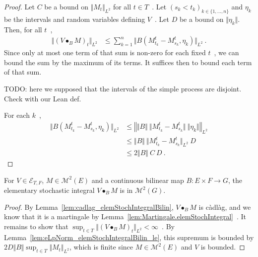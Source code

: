 \begin{proof}
Let $C$ be a bound on $\Vert M_t \Vert_{L^2}$ for all $t \in T$~.
Let $(s_k < t_k)_{k \in \{1, ..., n\}}$ and $\eta_k$ be the intervals and random variables defining $V$~.
Let $D$ be a bound on $\Vert\eta_k\Vert$.
Then, for all $t$~,
\begin{align*}
  \Vert (V \bullet_B M)_t \Vert_{L^2}
  &\le \sum_{k=1}^n \Vert B(M^t_{t_k} - M^t_{s_k}, \eta_k) \Vert_{L^2}
  \: .
\end{align*}
Since only at most one term of that sum is non-zero for each fixed $t$~, we can bound the sum by the maximum of its terms.
It suffices then to bound each term of that sum.

TODO: here we supposed that the intervals of the simple process are disjoint. Check with our Lean def.

For each $k$~,
\begin{align*}
  \Vert B(M^t_{t_k} - M^t_{s_k}, \eta_k) \Vert_{L^2}
  &\le \left\Vert \Vert B \Vert \: \Vert M^t_{t_k} - M^t_{s_k} \Vert  \: \Vert \eta_k \Vert \right\Vert_{L^2}
  \\
  &\le \Vert B \Vert \: \Vert M^t_{t_k} - M^t_{s_k} \Vert_{L^2} \: D
  \\
  &\le 2 \Vert B \Vert \: C \: D
  \: .
\end{align*}
\end{proof}


\begin{lemma}\label{lem:isSquareIntegrable_elemStochIntegralBilin}
For $V \in \mathcal{E}_{T, F}$, $M \in \mathcal{M}^2(E)$ and a continuous bilinear map $B: E \times F \to G$, the elementary stochastic integral $V \bullet_B M$ is in $\mathcal{M}^2(G)$.
\end{lemma}

\begin{proof}
By Lemma~\ref{lem:cadlag_elemStochIntegralBilin}, $V \bullet_B M$ is càdlàg, and we know that it is a martingale by Lemma~\ref{lem:Martingale.elemStochIntegral}~.
It remains to show that $\sup_{t \in T} \Vert (V \bullet_B M)_t \Vert_{L^2} < \infty$~.
By Lemma~\ref{lem:eLpNorm_elemStochIntegralBilin_le}, this supremum is bounded by $2 D \Vert B \Vert \sup_{t \in T} \Vert M_t \Vert_{L^2}$, which is finite since $M \in \mathcal{M}^2(E)$ and $V$ is bounded.
\end{proof}


